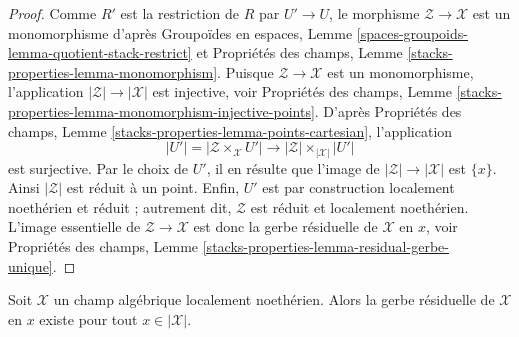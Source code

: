 \begin{proof}
Comme $R'$ est la restriction de $R$ par $U' \to U$, le morphisme
$\mathcal{Z} \to \mathcal{X}$ est un monomorphisme d'après Groupoïdes en
espaces, Lemme
\ref{spaces-groupoids-lemma-quotient-stack-restrict}
et Propriétés des champs, Lemme
\ref{stacks-properties-lemma-monomorphism}.
Puisque $\mathcal{Z} \to \mathcal{X}$ est un monomorphisme, l'application
$|\mathcal{Z}| \to |\mathcal{X}|$ est injective, voir Propriétés des champs,
Lemme
\ref{stacks-properties-lemma-monomorphism-injective-points}.
D'après Propriétés des champs, Lemme
\ref{stacks-properties-lemma-points-cartesian}, l'application
$$
|U'| = |\mathcal{Z} \times_\mathcal{X} U'|
\longrightarrow
|\mathcal{Z}| \times_{|\mathcal{X}|} |U'|
$$
est surjective. Par le choix de $U'$, il en résulte que l'image de
$|\mathcal{Z}| \to |\mathcal{X}|$ est $\{x\}$.
Ainsi $|\mathcal{Z}|$ est réduit à un point.
Enfin, $U'$ est par construction localement noethérien et réduit ; autrement
dit, $\mathcal{Z}$ est réduit et localement noethérien. L'image essentielle
de $\mathcal{Z} \to \mathcal{X}$ est donc la gerbe résiduelle de
$\mathcal{X}$ en $x$, voir Propriétés des champs, Lemme
\ref{stacks-properties-lemma-residual-gerbe-unique}.
\end{proof}

\begin{lemma}
\label{lemma-every-point-residual-gerbe-locally-Noetherian}
Soit $\mathcal{X}$ un champ algébrique localement noethérien.
Alors la gerbe résiduelle de $\mathcal{X}$ en $x$ existe pour tout
$x \in |\mathcal{X}|$.
\end{lemma}


